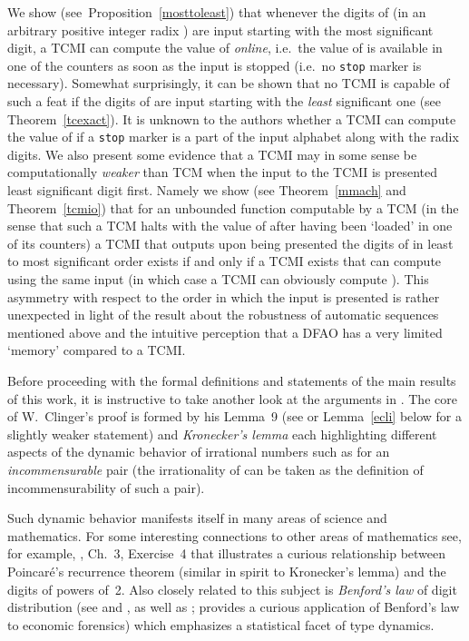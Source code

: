 \documentclass[12pt]{article}
\begin{document}
We show (see~Proposition~\ref{mosttoleast}) that whenever the digits of 
(in an arbitrary positive integer radix ) are input starting
with the most significant digit, a TCMI can compute the value of 
{\it online\/}, i.e.~the value of  is available in one of the
counters as soon as the input is stopped (i.e.~no {\tt stop} marker is
necessary). Somewhat surprisingly, it can be shown that no TCMI is
capable of such a feat if the digits of  are input starting with the
{\it least\/} significant one (see Theorem~\ref{tcexact}). It is
unknown to the authors whether a TCMI can compute the value of  if
a {\tt stop} marker is a part of the input alphabet along with the
radix  digits. We also present some evidence that a TCMI may in
some sense be
computationally {\it weaker\/} than TCM when the input to the TCMI is 
presented least significant digit first. Namely we show (see
Theorem~\ref{mmach} and Theorem~\ref{tcmio}) that for an
unbounded function  computable by a TCM (in the sense that such a
TCM halts with the value of  after having been `loaded'  in
one of its counters) a TCMI that outputs  upon being
presented the digits of  in least to most significant order exists
if and only if a
TCMI exists that can compute  using the same input (in which case a
TCMI can obviously compute ). This
asymmetry with respect to the order in which the input is presented is
rather unexpected in light of the result about the robustness of
automatic sequences mentioned above and the intuitive perception that
a DFAO has a very limited `memory' compared to a TCMI.  

Before proceeding with the formal definitions and statements of the
main results of this work, it is instructive to take another
look at the arguments in \cite{Clinger}. The core of W.~Clinger's proof
is formed by his Lemma~9 (see \cite{Clinger} or Lemma~\ref{ecli} below
for a slightly weaker statement) 
and {\it Kronecker's lemma\/} each highlighting different aspects of
the dynamic behavior of irrational numbers such as  for
an {\it incommensurable\/} pair  (the irrationality of
 can be taken as the definition of
incommensurability of such a pair). 

Such dynamic behavior manifests
itself in many areas of science and mathematics. For some interesting
connections to other areas of mathematics see, for example,
\cite{Arnold}, Ch.~3, Exercise~4 that illustrates a curious relationship
between Poincar\'e's recurrence theorem (similar in spirit to
Kronecker's lemma) and the digits of powers
of~2. Also closely related to this subject is {\it Benford's law\/} of digit 
distribution (see \cite{Benford} and
\cite{Newcomb}, as well as \cite{Hill}; \cite{Rauchetal} provides a
curious application of Benford's law to economic forensics) which
emphasizes a statistical facet of  type dynamics.
\end{document}

